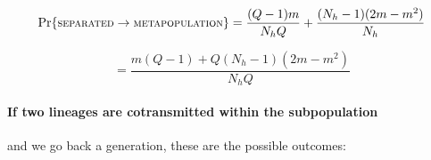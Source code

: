 \documentclass[_main.tex]{subfiles}
\begin{document}
\begin{equation*} \label{eq:coal321}
\Pr \{ \textsc{\small{separated}} \rightarrow \textsc{\small{metapopulation}} \} 
= \frac{(Q -1)m}{N_h Q} + \frac{(N_h-1)(2m - m^2)}{N_h}
\end{equation*}

\begin{equation*} \label{eq:coal321}
= \frac{m(Q-1) + Q (N_h-1)(2m - m^2)}{N_h Q}
\end{equation*}


\paragraph{If two lineages are cotransmitted within the subpopulation} and we go back a generation, these are the possible outcomes:
\end{document}
